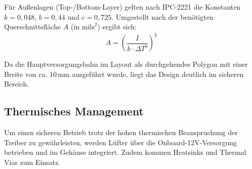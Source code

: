 Für Außenlagen (Top-/Bottom-Layer) gelten nach IPC-2221 die Konstanten $k = 0{,}048$, $b = 0{,}44$ und $c = 0{,}725$. Umgestellt nach der benötigten Querschnittsfläche $A$ (in $\text{mils}^2$) ergibt sich:
\begin{equation}
	A = \left( \frac{I}{k \cdot \Delta T^{b}} \right)^{\frac{1}{c}}	
\end{equation}

Da die Hauptversorgungsbahn im Layout als durchgehendes Polygon mit einer Breite von ca. $10\,\text{mm}$ ausgeführt wurde, liegt das Design deutlich im sicheren Bereich.\cite{a1998_ipc2221}

\subsection{Thermisches Management}
Um einen sicheren Betrieb trotz der hohen thermischen Beanspruchung der Treiber zu gewährleisten, werden Lüfter über die Onboard-12V-Versorgung betrieben und im Gehäuse integriert. Zudem kommen Heatsinks und Thermal Vias zum Einsatz.